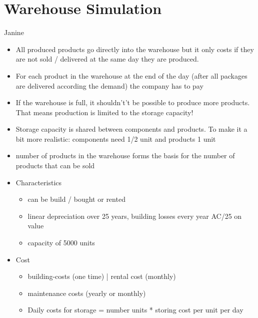 \documentclass[11pt,titlepage,oneside,openany]{book}
\begin{document}
\section{Warehouse Simulation}
Janine \\
\begin{itemize}
    \item All produced products go directly into the warehouse but it only costs if they are not sold / delivered at the same day they are produced.
    \item For each product in the warehouse at the end of the day (after all packages are delivered according the demand) the company has to pay
    \item If the warehouse is full, it shouldn't’t be possible to produce more products. That means production is limited to the storage capacity! 
    \item Storage capacity is shared between components and products. To make it a bit more realistic: components need 1/2 unit and products 1 unit
    \item number of products in the warehouse forms the basis for the number of products that can be sold
    \item Characteristics 
    \begin{itemize}
        \item can be build / bought or rented
        \item linear depreciation over 25 years, building losses every year AC/25 on value 
        \item capacity of 5000 units
    \end{itemize}
    \item Cost 
    \begin{itemize}
        \item building-costs (one time) | rental cost (monthly)
        \item maintenance costs (yearly or monthly) 
        \item Daily costs for storage = number units * storing cost per unit per day
    \end{itemize}
\end{itemize}
\end{document}
